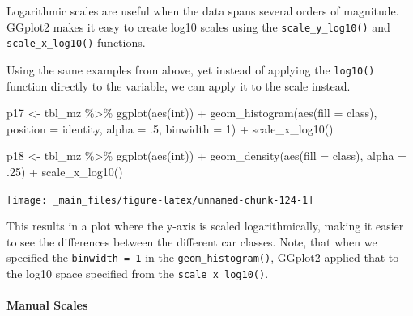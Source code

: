 \documentclass[
]{book}
\newenvironment{Shaded}{\begin{snugshade}}{\end{snugshade}}
\newcommand{\AttributeTok}[1]{\textcolor[rgb]{0.77,0.63,0.00}{#1}}
\newcommand{\DecValTok}[1]{\textcolor[rgb]{0.00,0.00,0.81}{#1}}
\newcommand{\FunctionTok}[1]{\textcolor[rgb]{0.00,0.00,0.00}{#1}}
\newcommand{\NormalTok}[1]{#1}
\newcommand{\OtherTok}[1]{\textcolor[rgb]{0.56,0.35,0.01}{#1}}
\newcommand{\SpecialCharTok}[1]{\textcolor[rgb]{0.00,0.00,0.00}{#1}}
\newcommand{\StringTok}[1]{\textcolor[rgb]{0.31,0.60,0.02}{#1}}
\begin{document}
Logarithmic scales are useful when the data spans several orders of magnitude. GGplot2 makes it easy to create log10 scales using the \texttt{scale\_y\_log10()} and \texttt{scale\_x\_log10()} functions.

Using the same examples from above, yet instead of applying the \texttt{log10()} function directly to the variable, we can apply it to the scale instead.

\begin{Shaded}
\begin{Highlighting}[]
\NormalTok{p17 }\OtherTok{\textless{}{-}}\NormalTok{ tbl\_mz }\SpecialCharTok{\%\textgreater{}\%} 
  \FunctionTok{ggplot}\NormalTok{(}\FunctionTok{aes}\NormalTok{(int)) }\SpecialCharTok{+} 
  \FunctionTok{geom\_histogram}\NormalTok{(}\FunctionTok{aes}\NormalTok{(}\AttributeTok{fill =}\NormalTok{ class), }\AttributeTok{position =} \StringTok{\textquotesingle{}identity\textquotesingle{}}\NormalTok{, }\AttributeTok{alpha =}\NormalTok{ .}\DecValTok{5}\NormalTok{, }\AttributeTok{binwidth =} \DecValTok{1}\NormalTok{) }\SpecialCharTok{+}
  \FunctionTok{scale\_x\_log10}\NormalTok{()}

\NormalTok{p18 }\OtherTok{\textless{}{-}}\NormalTok{ tbl\_mz }\SpecialCharTok{\%\textgreater{}\%} 
  \FunctionTok{ggplot}\NormalTok{(}\FunctionTok{aes}\NormalTok{(int)) }\SpecialCharTok{+} 
  \FunctionTok{geom\_density}\NormalTok{(}\FunctionTok{aes}\NormalTok{(}\AttributeTok{fill =}\NormalTok{ class), }\AttributeTok{alpha =}\NormalTok{ .}\DecValTok{25}\NormalTok{) }\SpecialCharTok{+}
  \FunctionTok{scale\_x\_log10}\NormalTok{()}
\end{Highlighting}
\end{Shaded}

\begin{center}\texttt{[image: \_main\_files/figure-latex/unnamed-chunk-124-1]} \end{center}

This results in a plot where the y-axis is scaled logarithmically, making it easier to see the differences between the different car classes. Note, that when we specified the \texttt{binwidth\ =\ 1} in the \texttt{geom\_histogram()}, GGplot2 applied that to the log10 space specified from the \texttt{scale\_x\_log10()}.

\hypertarget{manual-scales}{%
\paragraph*{Manual Scales}\label{manual-scales}}
\end{document}
